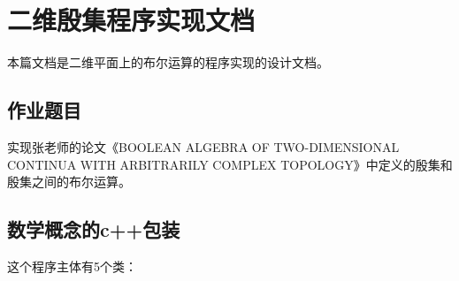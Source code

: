 \documentclass[a4paper]{book}
\makeatletter
\newcommand{\voidenvironment}[1]{%
  \expandafter\providecommand\csname env@#1@save@env\endcsname{}%
  \expandafter\providecommand\csname env@#1@process\endcsname{}%
  \@ifundefined{#1}{}{\RenewEnviron{#1}{}}%
}
\numberwithin{equation}{chapter}
\theoremstyle{definition}
\makeatother
\begin{document}
\pagestyle{empty}

\tableofcontents
\clearpage

\pagestyle{fancy}
\fancyhead{}
\rhead{\today}

\setcounter{chapter}{-1}




\chapter{二维殷集程序实现文档}
本篇文档是二维平面上的布尔运算的程序实现的设计文档。


\section{\heiti 作业题目}
实现张老师的论文《BOOLEAN ALGEBRA OF TWO-DIMENSIONAL CONTINUA
WITH ARBITRARILY COMPLEX TOPOLOGY》中定义的殷集和殷集之间的布尔运算。


\section{\heiti 数学概念的c++包装}

这个程序主体有5个类：
\end{document}
